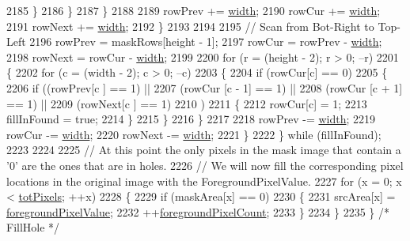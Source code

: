 \begin{DoxyCode}
2185           \}
2186         \}
2187       \}
2188 
2189       rowPrev += \hyperlink{class_k_k_b_1_1_raster_ae0bcc103e191c3421d7692dc69ceb554}{width};
2190       rowCur  += \hyperlink{class_k_k_b_1_1_raster_ae0bcc103e191c3421d7692dc69ceb554}{width};
2191       rowNext += \hyperlink{class_k_k_b_1_1_raster_ae0bcc103e191c3421d7692dc69ceb554}{width};
2192     \}
2193 
2194 
2195     \textcolor{comment}{// Scan from Bot-Right  to  Top-Left}
2196     rowPrev  = maskRows[height - 1];
2197     rowCur   = rowPrev - \hyperlink{class_k_k_b_1_1_raster_ae0bcc103e191c3421d7692dc69ceb554}{width};
2198     rowNext  = rowCur  - \hyperlink{class_k_k_b_1_1_raster_ae0bcc103e191c3421d7692dc69ceb554}{width};
2199 
2200     \textcolor{keywordflow}{for}  (r = (height - 2);  r > 0;  --r)
2201     \{
2202       \textcolor{keywordflow}{for}  (c = (width - 2);  c > 0;  --c)
2203       \{
2204         \textcolor{keywordflow}{if}  (rowCur[c] == 0)
2205         \{
2206           \textcolor{keywordflow}{if}  ((rowPrev[c    ] == 1)  ||  
2207                (rowCur [c - 1] == 1)  ||
2208                (rowCur [c + 1] == 1)  ||
2209                (rowNext[c    ] == 1)
2210               )
2211           \{
2212             rowCur[c] = 1;
2213             fillInFound = \textcolor{keyword}{true};
2214           \}
2215         \}
2216       \}
2217 
2218       rowPrev -= \hyperlink{class_k_k_b_1_1_raster_ae0bcc103e191c3421d7692dc69ceb554}{width};
2219       rowCur  -= \hyperlink{class_k_k_b_1_1_raster_ae0bcc103e191c3421d7692dc69ceb554}{width};
2220       rowNext -= \hyperlink{class_k_k_b_1_1_raster_ae0bcc103e191c3421d7692dc69ceb554}{width};
2221     \}
2222   \}  \textcolor{keywordflow}{while}  (fillInFound);
2223 
2224 
2225   \textcolor{comment}{// At this point the only pixels in the mask image that contain a '0' are the ones that are in holes.}
2226   \textcolor{comment}{// We will now fill the corresponding pixel locations in the original image with the
       ForegroundPixelValue.}
2227   \textcolor{keywordflow}{for}  (x = 0;  x < \hyperlink{class_k_k_b_1_1_raster_a9b08c4a0ca0a35435a478599635f1dc0}{totPixels};  ++x)
2228   \{
2229     \textcolor{keywordflow}{if}  (maskArea[x] == 0)
2230     \{
2231       srcArea[x] = \hyperlink{class_k_k_b_1_1_raster_ac9a5cec097e9fed669fe3c44bcc1678c}{foregroundPixelValue};
2232       ++\hyperlink{class_k_k_b_1_1_raster_aa7e86253f4b9c347da718732e44b60e8}{foregroundPixelCount};
2233     \}
2234   \}
2235 \}  \textcolor{comment}{/* FillHole */}
\end{DoxyCode}
